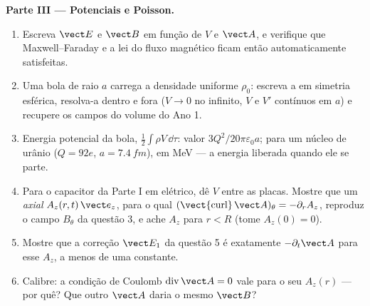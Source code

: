 \begin{problem}
\medskip
\noindent\textbf{Parte III --- Potenciais e Poisson.}
\begin{enumerate}[resume]
  \item Escreva $\vect E$ e $\vect B$ em função de $V$ e $\vect A$, e verifique
        que Maxwell--Faraday e a lei do fluxo magnético ficam então automaticamente
        satisfeitas.
  \item Uma bola de raio $a$ carrega a densidade uniforme $\rho_0$: escreva
        a  em simetria esférica, resolva-a dentro e
        fora ($V \to 0$ no infinito, $V$ e $V'$ contínuos em $a$) e
        recupere os campos do volume do Ano 1.
  \item Energia potencial da bola, $\tfrac12\int\rho V\,\dd\tau$: valor
        $3Q^2/20\pi\varepsilon_0a$; para um núcleo de urânio ($Q = 92e$, $a =
        \qty{7.4}{fm}$), em MeV --- a energia liberada quando ele se parte.
  \item Para o capacitor da Parte I em 
        elétrico, dê $V$ entre as placas. Mostre que um 
        \emph{axial} $A_z(r, t)\,\vect e_z$, para o qual $(\operatorname{\vect{curl}}
        \vect A)_\theta = -\partial_rA_z$, reproduz o campo $B_\theta$ da
        questão 3, e ache $A_z$ para $r < R$ (tome $A_z(0) = 0$).
  \item Mostre que a correção $\vect E_1$ da questão 5 é exatamente
        $-\partial_t\vect A$ para esse $A_z$, a menos de uma constante.
  \item Calibre: a condição de Coulomb $\operatorname{div}\vect A = 0$ vale para
        o seu $A_z(r)$ --- por quê? Que outro $\vect A$ daria o mesmo $\vect B$?
\end{enumerate}


\end{problem}
